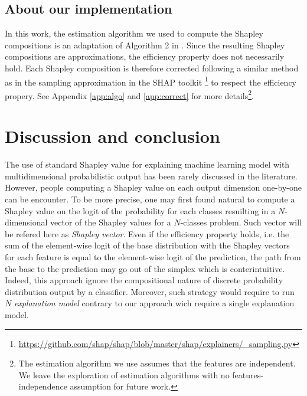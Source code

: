 \documentclass{article}
\theoremstyle{plain}
\theoremstyle{definition}
\theoremstyle{remark}
\begin{document}
\subsection{About our implementation}

In this work, the estimation algorithm we used to compute the Shapley compositions is an adaptation of Algorithm 2 in \cite{vstrumbelj2014explaining}. Since the resulting Shapley compositions are approximations, the efficiency property does not necessarily hold. Each Shapley composition is therefore corrected following a similar method as in the sampling approximation in the SHAP toolkit \cite{NIPS2017_7062}\footnote{\url{https://github.com/shap/shap/blob/master/shap/explainers/_sampling.py}} to respect the efficiency propery. See Appendix \ref{app:algo} and \ref{app:correct} for more details\footnote{The estimation algorithm we use assumes that the features are independent. We leave the exploration of estimation algorithms with no features-independence assumption for future work.}.


\section{Discussion and conclusion}
\label{sec:conclud}

The use of standard Shapley value for explaining machine learning model with multidimensional probabilistic output has been rarely discussed in the literature. However, people computing a Shapley value on each output dimension one-by-one can be encounter. To be more precise, one may first found natural to compute a Shapley value on the logit of the probability for each classes resuilting in a $N$-dimensional vector of the Shapley values for a $N$-classes problem. Such vector will be refered here as \emph{Shapley vector}. Even if the efficiency property holds, i.e. the sum of the element-wise logit of the base distribution with the Shapley vectors for each feature is equal to the element-wise logit of the prediction, the path from the base to the prediction may go out of the simplex which is conterintuitive. Indeed, this approach ignore the compositional nature of discrete probability distribution output by a classifier. Moreover, such strategy would require to run $N$ \emph{explanation model} contrary to our approach wich require a single explanation model.
\end{document}
